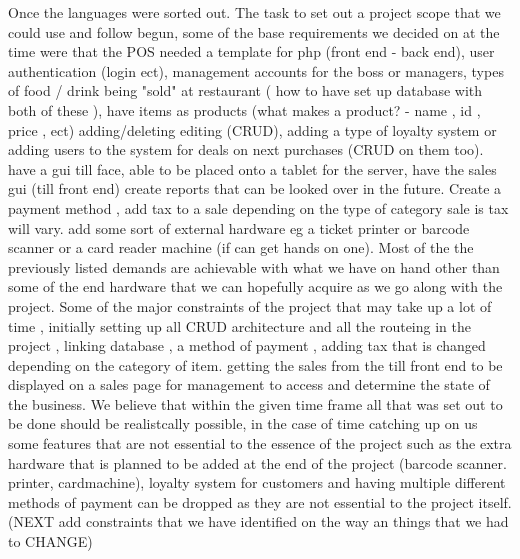 Once the languages were sorted out. The task to set out a project scope that we could use and follow begun, some of the base requirements we decided on at the time were that the POS needed a template for php (front end - back end), user authentication (login ect), management accounts for the boss or managers, types of food / drink being "sold" at restaurant ( how to have set up database with both of these ), have items as products (what makes a product? - name , id , price , ect) adding/deleting editing (CRUD), adding a type of loyalty system or adding users to the system for deals on next purchases (CRUD on them too). have a gui till face, able to be placed onto a tablet for the server, have the sales gui (till front end) create reports that can be looked over in the future. Create a payment method , add tax to a sale depending on the type of category sale is tax will vary. add some sort of external hardware eg a ticket printer or barcode scanner or a card reader machine (if can get hands on one). Most of the the previously listed demands are achievable with what we have on hand other than some of the end hardware that we can hopefully acquire as we go along with the project. Some of the major constraints of the project that may take up a lot of time , initially setting up all CRUD architecture and all the routeing in the project , linking database , a method of payment , adding tax that is changed depending on the category of item. getting the sales from the till front end to be displayed on a sales page for management to access and determine the state of the business. We believe that within the given time frame all that was set out to be done should be realistcally possible, in the case of time catching up on us some features that are not essential to the essence of the project such as the extra hardware that is planned to be added at the end of the project (barcode scanner. printer, cardmachine), loyalty system for customers and having multiple different methods of payment can be dropped as they are not essential to the project itself. (NEXT add constraints that we have identified on the way an things that we had to CHANGE)